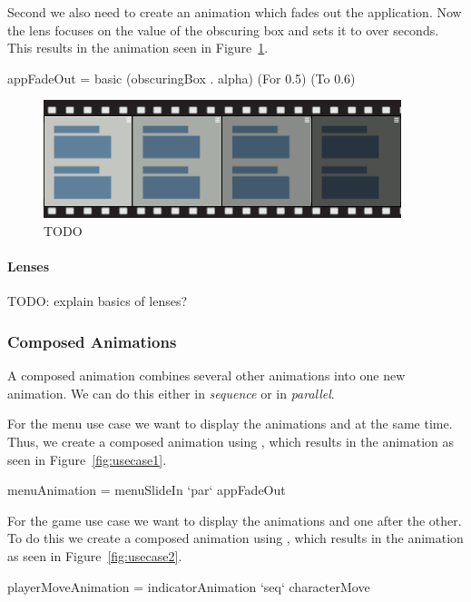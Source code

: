 Second we also need to create an animation which fades out the application. Now the lens focuses on the  value of the obscuring box and sets it to  over  seconds. This results in the animation seen in Figure~\ref{fig:usecase1basic2}.

\begin{spec}
appFadeOut = basic (obscuringBox . alpha) (For 0.5) (To 0.6)
\end{spec}

\begin{figure}[H]
\centering
\includegraphics[scale=0.4]{pictures/usecase1basic2.png}
\caption{TODO}
\label{fig:usecase1basic2}
\end{figure}

\paragraph{Lenses} TODO: explain basics of lenses?

\subsubsection{Composed Animations}

A composed animation combines several other animations into one new animation. We can do this either in \emph{sequence} or in \emph{parallel}.

For the menu use case we want to display the animations  and  at the same time. Thus, we create a composed animation using ,  which results in the animation as seen in Figure~\ref{fig:usecase1}.

\begin{spec}
menuAnimation = menuSlideIn `par` appFadeOut
\end{spec}

For the game use case we want to display the animations  and  one after the other. To do this we create a composed animation using , which results in the animation as seen in Figure~\ref{fig:usecase2}.

\begin{spec}
playerMoveAnimation = indicatorAnimation `seq` characterMove
\end{spec}

